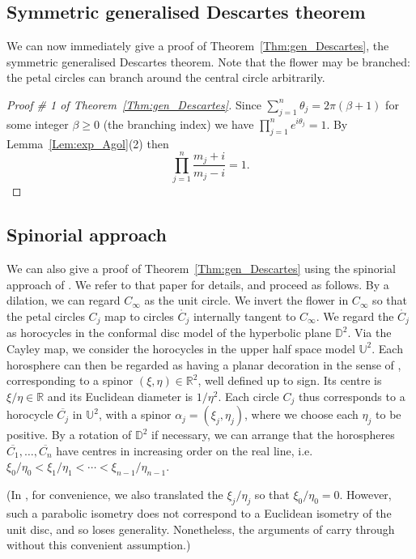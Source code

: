 \documentclass[12pt]{amsart}
\numberwithin{equation}{section}
\theoremstyle{named}
\newcommand{\reflem}[1]{Lemma~\ref{Lem:#1}}
\newcommand{\refthm}[1]{Theorem~\ref{Thm:#1}}
\newcommand{\R}{\mathbb{R}}
\begin{document}
\subsection{Symmetric generalised Descartes theorem}
\label{Sec:symmetric_Descartes}

We can now immediately give a proof of \refthm{gen_Descartes}, the symmetric generalised Descartes theorem. Note that the flower may be branched: the petal circles can branch around the central circle arbitrarily.
\begin{proof}[Proof \# 1 of \refthm{gen_Descartes}]
Since $\sum_{j=1}^n \theta_j = 2\pi (\beta+1)$ for some integer $\beta \geq 0$ (the branching index) we have $\prod_{j=1}^n e^{i \theta_j} = 1$. By \reflem{exp_Agol}(2) then
\[
\prod_{j=1}^n \frac{m_j + i}{m_j - i} = 1.
\]
\end{proof}

\subsection{Spinorial approach}

We can also give a proof of \refthm{gen_Descartes} using the spinorial approach of \cite{MZ25}. We refer to that paper for details, and proceed as follows. By a dilation, we can regard $C_\infty$ as the unit circle. We invert the flower in $C_\infty$ so that the petal circles $C_j$ map to circles $\mathring{C_j}$ internally tangent to $C_\infty$. We regard the $\mathring{C_j}$ as horocycles in the conformal disc model of the hyperbolic plane $\mathbb{D}^2$. Via the Cayley map, we consider the horocycles in the upper half space model $\mathbb{U}^2$. Each horosphere can then be regarded as having a planar decoration in the sense of \cite{M_spinors_horospheres}, corresponding to a spinor $(\xi, \eta) \in \R^2$, well defined up to sign. Its centre is $\xi/\eta \in \R$ and its Euclidean diameter is $1/\eta^2$. Each circle $C_j$ thus corresponds to a horocycle $\overline{C_j}$ in $\mathbb{U}^2$, with a spinor $\alpha_j = (\xi_j, \eta_j)$, where we choose each $\eta_j$ to be positive. By a rotation of $\mathbb{D}^2$ if necessary, we can arrange that the horospheres $\overline{C_1}, \ldots, \overline{C_n}$ have centres in increasing order on the real line, i.e. $\xi_0/\eta_0 < \xi_1/\eta_1 < \cdots < \xi_{n-1}/\eta_{n-1}$.

(In \cite{MZ25}, for convenience, we also translated the $\xi_j/\eta_j$ so that $\xi_0/\eta_0 = 0$. However, such a parabolic isometry does not correspond to a Euclidean isometry of the unit disc, and so loses generality. Nonetheless, the arguments of \cite{MZ25} carry through without this convenient assumption.)
\end{document}
